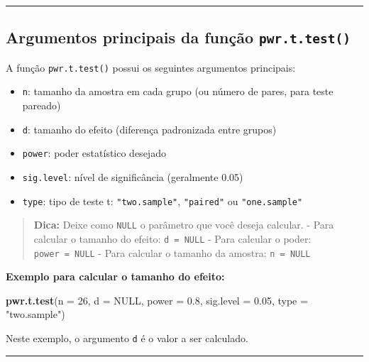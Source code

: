 \documentclass[
]{book}
\newenvironment{Shaded}{\begin{snugshade}}{\end{snugshade}}
\newcommand{\AttributeTok}[1]{\textcolor[rgb]{0.13,0.29,0.53}{#1}}
\newcommand{\ConstantTok}[1]{\textcolor[rgb]{0.56,0.35,0.01}{#1}}
\newcommand{\DecValTok}[1]{\textcolor[rgb]{0.00,0.00,0.81}{#1}}
\newcommand{\FloatTok}[1]{\textcolor[rgb]{0.00,0.00,0.81}{#1}}
\newcommand{\FunctionTok}[1]{\textcolor[rgb]{0.13,0.29,0.53}{\textbf{#1}}}
\newcommand{\NormalTok}[1]{#1}
\newcommand{\StringTok}[1]{\textcolor[rgb]{0.31,0.60,0.02}{#1}}
\providecommand{\tightlist}{%
  \setlength{\itemsep}{0pt}\setlength{\parskip}{0pt}}
\begin{document}
\begin{center}\rule{0.5\linewidth}{0.5pt}\end{center}

\subsection{\texorpdfstring{Argumentos principais da função \texttt{pwr.t.test()}}{Argumentos principais da função pwr.t.test()}}\label{argumentos-principais-da-funuxe7uxe3o-pwr.t.test}

A função \texttt{pwr.t.test()} possui os seguintes argumentos principais:

\begin{itemize}
\tightlist
\item
  \texttt{n}: tamanho da amostra em cada grupo (ou número de pares, para teste pareado)
\item
  \texttt{d}: tamanho do efeito (diferença padronizada entre grupos)
\item
  \texttt{power}: poder estatístico desejado
\item
  \texttt{sig.level}: nível de significância (geralmente 0.05)
\item
  \texttt{type}: tipo de teste t: \texttt{"two.sample"}, \texttt{"paired"} ou \texttt{"one.sample"}
\end{itemize}

\begin{quote}
\textbf{Dica:} Deixe como \texttt{NULL} o parâmetro que você deseja calcular.
- Para calcular o tamanho do efeito: \texttt{d\ =\ NULL}
- Para calcular o poder: \texttt{power\ =\ NULL}
- Para calcular o tamanho da amostra: \texttt{n\ =\ NULL}
\end{quote}

\textbf{Exemplo para calcular o tamanho do efeito:}

\begin{Shaded}
\begin{Highlighting}[]
\FunctionTok{pwr.t.test}\NormalTok{(}\AttributeTok{n =} \DecValTok{26}\NormalTok{, }\AttributeTok{d =} \ConstantTok{NULL}\NormalTok{, }\AttributeTok{power =} \FloatTok{0.8}\NormalTok{, }\AttributeTok{sig.level =} \FloatTok{0.05}\NormalTok{, }\AttributeTok{type =} \StringTok{"two.sample"}\NormalTok{)}
\end{Highlighting}
\end{Shaded}

Neste exemplo, o argumento \texttt{d} é o valor a ser calculado.

\begin{center}\rule{0.5\linewidth}{0.5pt}\end{center}
\end{document}
